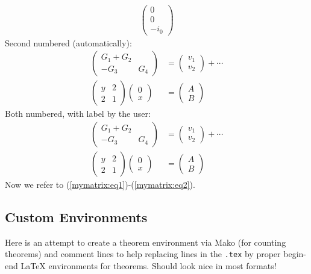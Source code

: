 \documentclass[%
oneside,                 %
final,                   %
10pt]{article}
\theoremstyle{definition}
\begin{document}
\begin{enumerate}
\begin{align}
\begin{pmatrix}
 0 \\ 
 0 \\ 
 -i_0
\end{pmatrix}
\nonumber
\end{align}
Second numbered (automatically):
\begin{align}
\begin{pmatrix}
G_1 + G_2\\ 
-G_3 & G_4
\end{pmatrix}
&=
\begin{pmatrix}
 v_1 \\ 
 v_2
\end{pmatrix}
+ \cdots\nonumber
\\ 
\left(\begin{array}{ll}
y & 2\\ 
2 & 1
\end{array}\right)
\left(\begin{array}{ll}
0 \\ x
\end{array}\right)
&= \begin{pmatrix}
A \\ B
\end{pmatrix}
\end{align}
Both numbered, with label by the user:
\begin{align}
\begin{pmatrix}
G_1 + G_2\\ 
-G_3 & G_4
\end{pmatrix}
&=
\begin{pmatrix}
 v_1 \\ 
 v_2
\end{pmatrix}
+ \cdots \label{mymatrix:eq1}
\\ 
\label{mymatrix:eq2}
\left(\begin{array}{ll}
y & 2\\ 
2 & 1
\end{array}\right)
\left(\begin{array}{ll}
0 \\ x
\end{array}\right)
&= \begin{pmatrix}
A \\ B
\end{pmatrix}
\end{align}
Now we refer to (\ref{mymatrix:eq1})-(\ref{mymatrix:eq2}).
\subsection{Custom Environments}
Here is an attempt to create a theorem environment via Mako
(for counting theorems) and comment lines to help replacing lines in
the \texttt{.tex} by proper begin-end {\LaTeX} environments for theorems.
Should look nice in most formats!
\label{theorem:fundamental1}

\end{enumerate}
\end{document}
